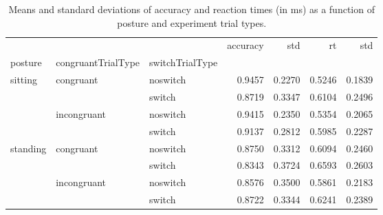 \begin{table}
\centering
\caption{Means and standard deviations of accuracy and reaction times (in ms) as a function of posture and experiment trial types.}
\label{table-task-switching-replication-reaction-time}
\begin{tabular}{lllrrrr}
\toprule
         &             &        & accuracy &    std &     rt &    std \\
posture & congruantTrialType & switchTrialType &          &        &        &        \\
\midrule
sitting & congruant & noswitch &   0.9457 & 0.2270 & 0.5246 & 0.1839 \\
         &             & switch &   0.8719 & 0.3347 & 0.6104 & 0.2496 \\
         & incongruant & noswitch &   0.9415 & 0.2350 & 0.5354 & 0.2065 \\
         &             & switch &   0.9137 & 0.2812 & 0.5985 & 0.2287 \\
standing & congruant & noswitch &   0.8750 & 0.3312 & 0.6094 & 0.2460 \\
         &             & switch &   0.8343 & 0.3724 & 0.6593 & 0.2603 \\
         & incongruant & noswitch &   0.8576 & 0.3500 & 0.5861 & 0.2183 \\
         &             & switch &   0.8722 & 0.3344 & 0.6241 & 0.2389 \\
\bottomrule
\end{tabular}
\end{table}
